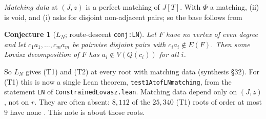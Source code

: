 \documentclass[11pt]{amsart}
\newtheorem{conjecture}[theorem]{Conjecture}
\theoremstyle{definition}
\theoremstyle{remark}
\renewcommand{\_}{\oldunderscore\allowbreak}
\begin{document}
\emph{Matching data} at $(J,z)$ is a perfect matching of $J[T]$. With $\Phi$ a matching, (ii) is
void, and (i) asks for disjoint non-adjacent pairs; so the base follows from

\begin{conjecture}[$L_N$; route-descent \texttt{conj:LN}]
Let $F$ have no vertex of even degree and let $c_1a_1,\dots,c_ma_m$ be pairwise disjoint pairs with
$c_ia_i\notin E(F)$. Then some Lov\'asz decomposition of $F$ has $a_i\notin V(Q(c_i))$ for all $i$.
\end{conjecture}

So $L_N$ gives (T1) and (T2) at every root with matching data (synthesis \S32). For (T1)
this is now a single Lean theorem, \texttt{test1At\_of\_LN\_matching}, from the statement
\texttt{LN} of \texttt{ConstrainedLovasz.lean}. Matching data depend
only on $(J,z)$, not on $r$. They are often absent: $8{,}112$ of the $25{,}340$ (T1) roots of
order at most $9$ have none \cite{T2}. This note is about those roots.
\end{document}
